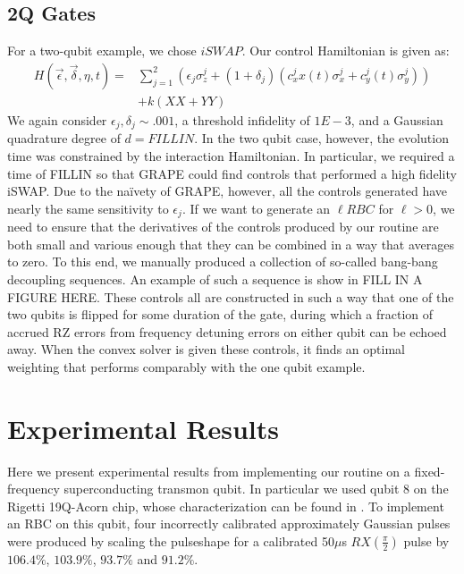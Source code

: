 \documentclass[aps,nofootinbib,pra,notitlepage,twocolumn]{revtex4-1}
\begin{document}
\subsection{2Q Gates}\label{2Q Gates}
 For a two-qubit example, we chose $iSWAP$. Our control Hamiltonian is given as:
\begin{equation} \label{eq:2Qham}
\begin{split}
H(\vec{\epsilon}, \vec{\delta}, \eta, t) = &\sum_{j=1}^2(\epsilon_j\sigma_z^j + (1 + \delta_j)(c_x^jx(t)\sigma_x^j + c_y^j(t)\sigma_y^j)) \\
&+ k(XX + YY)
\end{split}
\end{equation}
We again consider $\epsilon_j, \delta_j \sim .001$, a threshold infidelity of $1E-3$, and a Gaussian quadrature degree of $d=FILL IN$. In the two qubit case, however, the evolution time was constrained by the interaction Hamiltonian. In particular, we required a time of FILLIN so that GRAPE could find controls that performed a high fidelity iSWAP. Due to the na\"ivety of GRAPE, however, all the controls generated have nearly the same sensitivity to $\epsilon_j$. If we want to generate an $\ell RBC$ for $\ell > 0$, we need to ensure that the derivatives of the controls produced by our routine are both small and various enough that they can be combined in a way that averages to zero. To this end, we manually produced a collection of so-called bang-bang decoupling sequences. An example of such a sequence is show in FILL IN A FIGURE HERE. These controls all are constructed in such a way that one of the two qubits is flipped for some duration of the gate, during which a fraction of accrued RZ errors from frequency detuning errors on either qubit can be echoed away. When the convex solver is given these controls, it finds an optimal weighting that performs comparably with the one qubit example.

\section{Experimental Results}\label{experimental}
Here we present experimental results from implementing our routine on a fixed-frequency superconducting transmon qubit. In particular we used qubit 8 on the Rigetti 19Q-Acorn chip, whose characterization can be found in \cite{1712.05771}. To implement an RBC on this qubit, four incorrectly calibrated approximately Gaussian pulses were produced by scaling the pulseshape for a calibrated 50$\mu$s $RX(\frac{\pi}{2})$ pulse by $106.4\%$,  $103.9\%$, $93.7\%$ and $91.2\%$.
\end{document}
